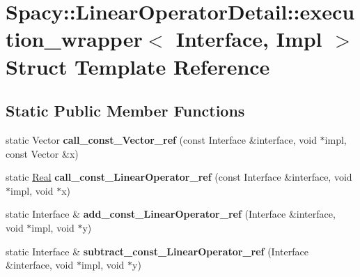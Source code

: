 \hypertarget{structSpacy_1_1LinearOperatorDetail_1_1execution__wrapper}{\section{\-Spacy\-:\-:\-Linear\-Operator\-Detail\-:\-:execution\-\_\-wrapper$<$ \-Interface, \-Impl $>$ \-Struct \-Template \-Reference}
\label{structSpacy_1_1LinearOperatorDetail_1_1execution__wrapper}
}
\subsection*{\-Static \-Public \-Member \-Functions}
\begin{DoxyCompactItemize}
\item 
\hypertarget{structSpacy_1_1LinearOperatorDetail_1_1execution__wrapper_a8a03855313956ef6efe25b364e5f2082}{static \-Vector {\bfseries call\-\_\-const\-\_\-\-Vector\-\_\-ref} (const \-Interface \&interface, void $\ast$impl, const \-Vector \&x)}\label{structSpacy_1_1LinearOperatorDetail_1_1execution__wrapper_a8a03855313956ef6efe25b364e5f2082}

\item 
\hypertarget{structSpacy_1_1LinearOperatorDetail_1_1execution__wrapper_afe3c459579d29886470d2dae73e95a04}{static \hyperlink{classSpacy_1_1Real}{\-Real} {\bfseries call\-\_\-const\-\_\-\-Linear\-Operator\-\_\-ref} (const \-Interface \&interface, void $\ast$impl, void $\ast$x)}\label{structSpacy_1_1LinearOperatorDetail_1_1execution__wrapper_afe3c459579d29886470d2dae73e95a04}

\item 
\hypertarget{structSpacy_1_1LinearOperatorDetail_1_1execution__wrapper_a826b751f6d824158c2673c44699ce6da}{static \-Interface \& {\bfseries add\-\_\-const\-\_\-\-Linear\-Operator\-\_\-ref} (\-Interface \&interface, void $\ast$impl, void $\ast$y)}\label{structSpacy_1_1LinearOperatorDetail_1_1execution__wrapper_a826b751f6d824158c2673c44699ce6da}

\item 
\hypertarget{structSpacy_1_1LinearOperatorDetail_1_1execution__wrapper_aa72fe89e302d07ca3bff922df97bc3ca}{static \-Interface \& {\bfseries subtract\-\_\-const\-\_\-\-Linear\-Operator\-\_\-ref} (\-Interface \&interface, void $\ast$impl, void $\ast$y)}\label{structSpacy_1_1LinearOperatorDetail_1_1execution__wrapper_aa72fe89e302d07ca3bff922df97bc3ca}


\end{DoxyCompactItemize}
